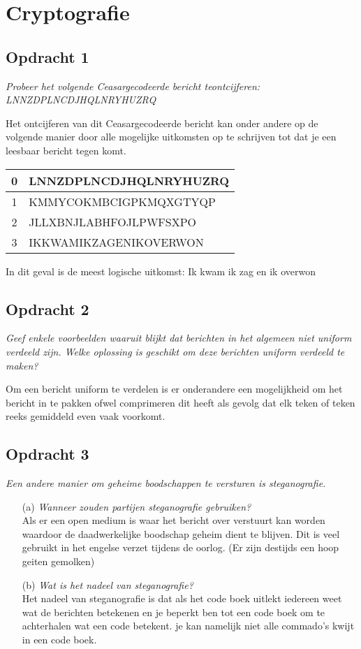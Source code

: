 \chapter{Cryptografie}

\section{Opdracht 1}
\emph{Probeer het volgende Ceasargecodeerde bericht teontcijferen:\\
LNNZDPLNCDJHQLNRYHUZRQ}

Het ontcijferen van dit Ceasargecodeerde bericht kan onder andere op de volgende manier door alle mogelijke uitkomsten op te schrijven tot dat je een leesbaar bericht tegen komt.

\begin{tabular}{|c|l|}
  \hline
  0 & LNNZDPLNCDJHQLNRYHUZRQ \\\hline
  1 & KMMYCOKMBCIGPKMQXGTYQP \\\hline
  2 & JLLXBNJLABHFOJLPWFSXPO \\\hline
  3 & IKKWAMIKZAGENIKOVERWON \\\hline
\end{tabular}

In dit geval is de meest logische uitkomst: Ik kwam ik zag en ik overwon

\section{Opdracht 2}
\emph{Geef enkele voorbeelden waaruit blijkt dat berichten in het algemeen niet uniform verdeeld zijn. Welke oplossing is geschikt om deze berichten uniform verdeeld te maken?}

Om een bericht uniform te verdelen is er onderandere een mogelijkheid om het bericht in te pakken ofwel comprimeren dit heeft als gevolg dat elk teken of teken reeks gemiddeld even vaak voorkomt.

\section{Opdracht 3}
\emph{Een andere manier om geheime boodschappen te versturen is steganografie.}
\begin{itemize}
\item[(a)] \emph{Wanneer zouden partijen steganografie gebruiken?} \\
  Als er een open medium is waar het bericht over verstuurt kan worden waardoor de daadwerkelijke boodschap geheim dient te blijven. Dit is veel gebruikt in het engelse verzet tijdens de oorlog. (Er zijn destijds een hoop geiten gemolken)
\item[(b)] \emph{Wat is het nadeel van steganografie?}\\
  Het nadeel van steganografie is dat als het code boek uitlekt iedereen weet wat de berichten betekenen en je beperkt ben tot een code boek om te achterhalen wat een code betekent. je kan namelijk niet alle commado's kwijt in een code boek.
\end{itemize}

